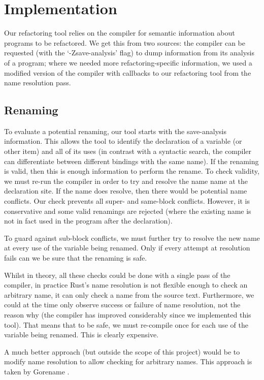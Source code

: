 \section{Implementation}\label{C:impl}

Our refactoring tool relies on the compiler for semantic information about programs to be refactored. We get this from two sources: the compiler can be requested (with the `-Zsave-analysis' flag) to dump information from its analysis of a program; where we needed more refactoring-specific information, we used a modified version of the compiler with callbacks to our refactoring tool from the name resolution pass.

\subsection{Renaming}

To evaluate a potential renaming, our tool starts with the save-analysis information. This allows the tool to identify the declaration of a variable (or other item) and all of its uses (in contrast with a syntactic search, the compiler can differentiate between different bindings with the same name). If the renaming is valid, then this is enough information to perform the rename. To check validity, we must re-run the compiler in order to try and resolve the name name at the declaration site. If the name does resolve, then there would be potential name conflicts. Our check prevents all super- and same-block conflicts. However, it is conservative and some valid renamings are rejected (where the existing name is not in fact used in the program after the declaration).

To guard against sub-block conflicts, we must further try to resolve the new name at every use of the variable being renamed. Only if every attempt at resolution fails can we be sure that the renaming is safe.

Whilst in theory, all these checks could be done with a single pass of the compiler, in practice Rust's name resolution is not flexible enough to check an arbitrary name, it can only check a name from the source text. Furthermore, we could at the time only observe success or failure of name resolution, not the reason why (the compiler has improved considerably since we implemented this tool). That means that to be safe, we must re-compile once for each use of the variable being renamed. This is clearly expensive.

A much better approach (but outside the scope of this project) would be to modify name resolution to allow checking for arbitrary names. This approach is taken by Gorename \cite{gorename15}.

